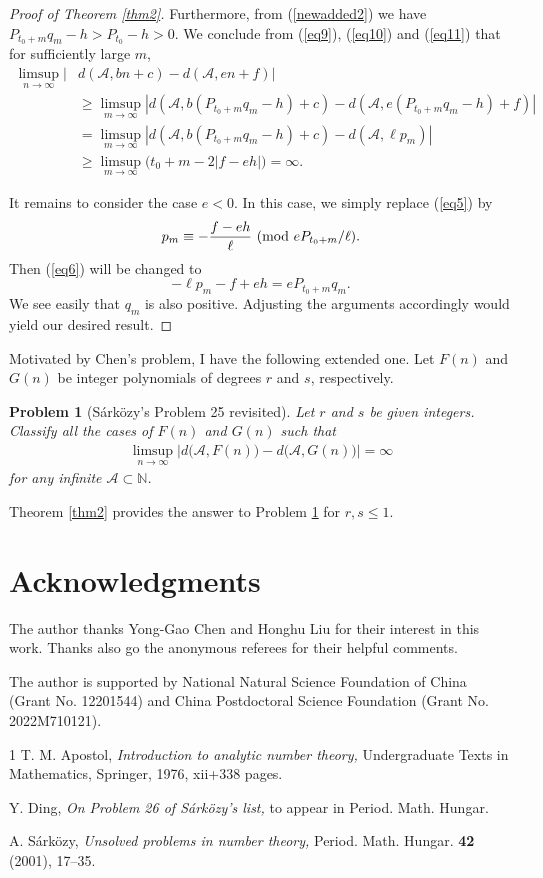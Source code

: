 \documentclass[12pt,a4paper,reqno]{amsart}
\numberwithin{equation}{section}
\def\pmod #1{\ ({\rm{mod}}\ #1)}
\theoremstyle{plain}
\newtheorem{problem}{Problem}
\theoremstyle{definition}
\begin{document}
\begin{proof}[Proof of Theorem \ref{thm2}]
Furthermore, from (\ref{newadded2}) we have 
$
P_{t_0+m}q_m-h>P_{t_0}-h>0.
$
We conclude from (\ref{eq9}), (\ref{eq10}) and (\ref{eq11}) that for sufficiently large $m$,
\begin{align*}
\limsup_{n\rightarrow\infty}|&d(\mathcal{A},bn+c)-d(\mathcal{A},en+f)|\\
&\ge\limsup_{m\rightarrow\infty}|d(\mathcal{A},b(P_{t_0+m}q_m-h)+c)-d(\mathcal{A},e(P_{t_0+m}q_m-h)+f)|\\
&=\limsup_{m\rightarrow\infty}|d(\mathcal{A},b(P_{t_0+m}q_m-h)+c)-d(\mathcal{A},\ell p_m)|\\
&\ge \limsup_{m\rightarrow\infty}\big(t_0+m-2|f-eh|\big)=\infty.
\end{align*}

It remains to consider the case $e<0$. In this case, we simply replace (\ref{eq5}) by
$$
p_m\equiv -\frac{f-eh}{\ell} \pmod{eP_{t_0+m}/\ell}.
$$
Then (\ref{eq6}) will be changed to
$$
-\ell p_m-f+eh=eP_{t_0+m}q_m.
$$
We see easily that $q_m$ is also positive. Adjusting the arguments accordingly would yield our desired result. 
\end{proof}

Motivated by Chen's problem, I have the following extended one.
Let $F(n)$ and $G(n)$ be integer polynomials of degrees $r$ and $s$, respectively.

\begin{problem}[S\'ark\"ozy's Problem 25 revisited]\label{problem-3}
Let $r$ and $s$ be given integers. Classify all the cases of $F(n)$ and $G(n)$ such that
\begin{align*}
\limsup_{n\rightarrow\infty}\big|d\big(\mathcal{A},F(n)\big)-d\big(\mathcal{A},G(n)\big)\big|=\infty
\end{align*}
for any infinite $\mathcal{A}\subset \mathbb{N}$.
\end{problem}

\medskip

Theorem \ref{thm2} provides the answer to Problem \ref{problem-3} for $r, s\le 1$.


\section*{Acknowledgments}
The author thanks Yong-Gao Chen and Honghu Liu for their interest in this work. Thanks also go the anonymous referees for their helpful comments.

The author is supported by National Natural Science Foundation of China  (Grant No. 12201544) and China Postdoctoral Science Foundation (Grant No. 2022M710121).

\begin{thebibliography}{1}
T. M. Apostol, {\it Introduction to analytic number theory,} Undergraduate Texts in Mathematics, Springer, 1976, xii+338 pages.

Y. Ding, {\it On Problem 26 of S\'ark\"ozy's list,} to appear in Period. Math. Hungar.

A. S\'ark\"ozy, {\it Unsolved problems in number theory,} Period. Math. Hungar. {\bf 42} (2001), 17--35.

\end{thebibliography}
\end{document}
